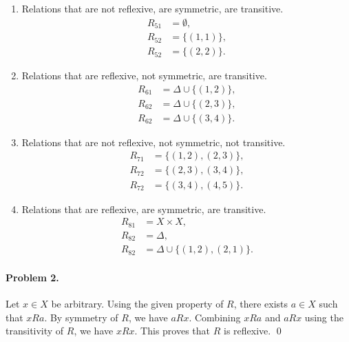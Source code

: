 \documentclass[10pt]{article}
\begin{document}
\begin{enumerate}
        \item Relations that are not reflexive, are symmetric, are transitive.
        \begin{align*}
            R_{51} &= \emptyset, \\
            R_{52} &= \{(1, 1)\}, \\
            R_{52} &= \{(2, 2)\}.
        \end{align*}

        \item Relations that are reflexive, not symmetric, are transitive.
        \begin{align*}
            R_{61} &= \Delta \cup \{(1, 2)\}, \\
            R_{62} &= \Delta \cup \{(2, 3)\}, \\
            R_{62} &= \Delta \cup \{(3, 4)\}.
        \end{align*}

        \item Relations that are not reflexive, not symmetric, not transitive.
        \begin{align*}
            R_{71} &= \{(1, 2), (2, 3)\}, \\
            R_{72} &= \{(2, 3), (3, 4)\}, \\
            R_{72} &= \{(3, 4), (4, 5)\}.
        \end{align*}

        \item Relations that are reflexive, are symmetric, are transitive.
        \begin{align*}
            R_{81} &= X\times X, \\
            R_{82} &= \Delta, \\
            R_{82} &= \Delta \cup \{(1, 2), (2, 1)\}.
        \end{align*}
    \end{enumerate}



    \paragraph{Problem 2.}
    Let $x \in X$ be arbitrary. Using the given property of $R$, there exists
    $a \in X$ such that $xRa$. By symmetry of $R$, we have $aRx$. Combining
    $xRa$ and $aRx$ using the transitivity of $R$, we have $xRx$.
    This proves that $R$ is reflexive. \qed
\end{document}
